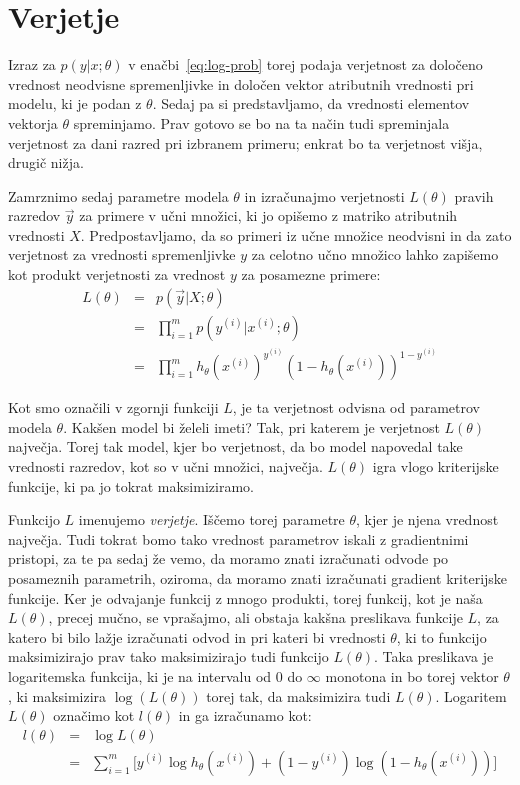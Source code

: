 \section{Verjetje}

Izraz za $p(y|x;\theta)$ v enačbi~\ref{eq:log-prob} torej podaja verjetnost za določeno vrednost neodvisne spremenljivke in določen vektor atributnih vrednosti pri modelu, ki je podan z $\theta$. Sedaj pa si predstavljamo, da vrednosti elementov vektorja $\theta$ spreminjamo. Prav gotovo se bo na ta način tudi spreminjala verjetnost za dani razred pri izbranem primeru; enkrat bo ta verjetnost višja, drugič nižja.

Zamrznimo sedaj parametre modela $\theta$ in izračunajmo verjetnosti $L(\theta)$ pravih razredov $\vec{y}$ za primere v učni množici, ki jo opišemo z matriko atributnih vrednosti $X$. Predpostavljamo, da so primeri iz učne množice neodvisni in da zato verjetnost za vrednosti spremenljivke $y$ za celotno učno množico lahko zapišemo kot produkt verjetnosti za vrednost $y$ za posamezne primere:
\begin{eqnarray}
  L(\theta) & = & p(\vec{y}|X;\theta) \nonumber\\
  & = & \prod_{i=1}^m p(y^{(i)}|x^{(i)};\theta) \nonumber\\
  & = & \prod_{i=1}^m h_\theta(x^{(i)})^{y^{(i)}}(1-h_\theta(x^{(i)}))^{1-y^{(i)}}
\end{eqnarray}

Kot smo označili v zgornji funkciji $L$, je ta verjetnost odvisna od parametrov modela $\theta$. Kakšen model bi želeli imeti? Tak, pri katerem je verjetnost $L(\theta)$ največja. Torej tak model, kjer bo verjetnost, da bo model napovedal take vrednosti razredov, kot so v učni množici, največja. $L(\theta)$ igra vlogo kriterijske funkcije, ki pa jo tokrat maksimiziramo.

Funkcijo $L$ imenujemo {\em verjetje}. Iščemo torej parametre $\theta$, kjer je njena vrednost največja. Tudi tokrat bomo tako vrednost parametrov iskali z gradientnimi pristopi, za te pa sedaj že vemo, da moramo znati izračunati odvode po posameznih parametrih, oziroma, da moramo znati izračunati gradient kriterijske funkcije. Ker je odvajanje funkcij z mnogo produkti, torej funkcij, kot je naša $L(\theta)$, precej mučno, se vprašajmo, ali obstaja kakšna preslikava funkcije $L$, za katero bi bilo lažje izračunati odvod in pri kateri bi vrednosti $\theta$, ki to funkcijo maksimizirajo prav tako maksimizirajo tudi funkcijo $L(\theta)$. Taka preslikava je logaritemska funkcija, ki je na intervalu od 0 do $\infty$ monotona in bo torej vektor $\theta$, ki maksimizira $\log(L(\theta))$ torej tak, da maksimizira tudi $L(\theta)$. Logaritem $L(\theta)$ označimo kot $l(\theta)$ in ga izračunamo kot:
\begin{eqnarray}
  l(\theta) & = & \log L(\theta) \nonumber\\
  & = & \sum_{i=1}^m\big[y^{(i)}\log h_\theta(x^{(i)})+(1-y^{(i)})\log (1-h_\theta(x^{(i)})) \big]
\end{eqnarray}

